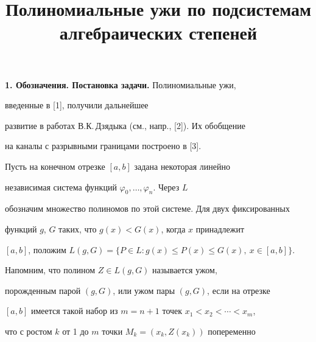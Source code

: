 \title{Полиномиальные ужи по подсистемам\\ 


алгебраических степеней} 


 


\date{} 




\pagestyle{plain} %


 




\maketitle 


\label{begin} 


 


 


{\bf 1. Обозначения. Постановка задачи.} Полиномиальные ужи, 


введенные в [1], получили дальнейшее 


развитие в работах В.К.\,Дзядыка (см., напр., [2]). Их обобщение 


на каналы с разрывными границами построено в [3]. 


 


Пусть на конечном отрезке $[a,b]$ задана некоторая линейно 


независимая система функций $\varphi_0,\dotsc,\varphi_n$. Через $L$ 


обозначим множество полиномов по этой системе. Для двух фиксированных 


функций $g$, $G$ таких, что $g(x)<G(x)$, когда $x$ принадлежит 


$[a,b]$, положим $L(g,G)=\{P\in L:g(x)\le P(x)\le G(x),\ x\in[a,b]\}$. 


 


Напомним, что полином $Z\in L(g,G)$ называется ужом, 


порожденным парой $(g,G)$, или ужом пары $(g,G)$, если на отрезке 


$[a,b]$ имеется такой набор из $m=n+1$ точек $x_1<x_2<\dotsb<x_m$, 


что с ростом $k$ от 1 до $m$ точки $M_k=(x_k,Z(x_k))$ попеременно 


